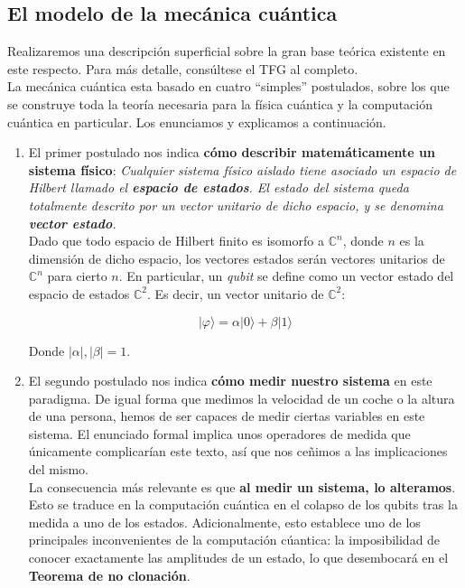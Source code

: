 \documentclass[11pt]{article}
\newcommand*{\C}{\mathbb{C}}
\newcommand*{\ra}{\rangle}
\begin{document}
\subsection{El modelo de la mecánica cuántica}

Realizaremos una descripción superficial sobre la gran base teórica existente en este respecto. Para más detalle, consúltese el TFG al completo. \\

La mecánica cuántica esta basado en cuatro ``simples'' postulados, sobre los que se construye toda la teoría necesaria para la física cuántica y la computación cuántica en particular. Los enunciamos y explicamos a continuación.

\begin{enumerate}
	\item El primer postulado nos indica \textbf{cómo describir matemáticamente un sistema físico}: \emph{Cualquier sistema físico aislado tiene asociado un espacio de Hilbert llamado el \textbf{espacio de estados}. El estado del sistema queda totalmente descrito por un vector unitario de dicho espacio, y se denomina \textbf{vector estado}.} \\
	
	Dado que todo espacio de Hilbert finito es isomorfo a $\mathbb C^n$, donde $n$ es la dimensión de dicho espacio, los vectores estados serán vectores unitarios de $\C^n$ para cierto $n$. En particular, un \emph{qubit} se define como un vector estado del espacio de estados $\C^2$. Es decir, un vector unitario de $\C^2$:
	
	\[ |\varphi\ra = \alpha|0\ra + \beta|1\ra \]
	
	Donde $|\alpha|, |\beta| = 1$.
	
	\item El segundo postulado nos indica \textbf{cómo medir nuestro sistema} en este paradigma. De igual forma que medimos la velocidad de un coche o la altura de una persona, hemos de ser capaces de medir ciertas variables en este sistema. El enunciado formal implica unos operadores de medida que únicamente complicarían este texto, así que nos ceñimos a las implicaciones del mismo. \\
	
	La consecuencia más relevante es que \textbf{al medir un sistema, lo alteramos}. Esto se traduce en la computación cuántica en el colapso de los qubits tras la medida a uno de los estados. Adicionalmente, esto establece uno de los principales inconvenientes de la computación cúantica: la imposibilidad de conocer exactamente las amplitudes de un estado, lo que desembocará en el \textbf{Teorema de no clonación}.
	

\end{enumerate}
\end{document}
